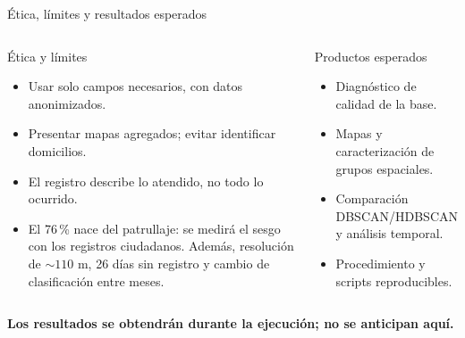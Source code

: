 \documentclass[aspectratio=169,10pt]{beamer}
\begin{document}
\begin{frame}{Ética, límites y resultados esperados}
  \begin{columns}[T,onlytextwidth]
      \begin{block}{Ética y límites}
        \begin{itemize}
          \item Usar solo campos necesarios, con datos anonimizados.
          \item Presentar mapas agregados; evitar identificar domicilios.
          \item El registro describe lo atendido, no todo lo ocurrido.
          \item El 76\,\% nace del patrullaje: se medirá el sesgo con los registros ciudadanos. Además, resolución de ${\sim}110$ m, 26 días sin registro y cambio de clasificación entre meses.
        \end{itemize}
      \end{block}
      \begin{block}{Productos esperados}
        \begin{itemize}
          \item Diagnóstico de calidad de la base.
          \item Mapas y caracterización de grupos espaciales.
          \item Comparación DBSCAN/HDBSCAN y análisis temporal.
          \item Procedimiento y scripts reproducibles.
        \end{itemize}
      \end{block}
  \end{columns}
  \vspace{.12cm}
  \centering\textbf{Los resultados se obtendrán durante la ejecución; no se anticipan aquí.}
\end{frame}
\end{document}

